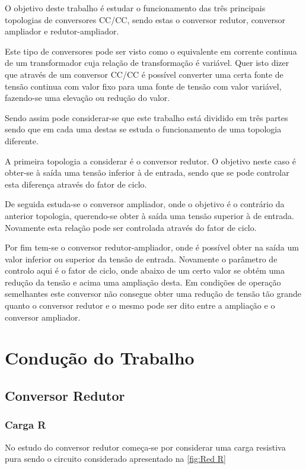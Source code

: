 \documentclass[a4paper,11pt]{article}
\numberwithin{equation}{section}
\begin{document}
O objetivo deste trabalho é estudar o funcionamento das três principais topologias de conversores CC/CC, sendo estas o conversor redutor, conversor ampliador e redutor-ampliador.

Este tipo de conversores pode ser visto como o equivalente em corrente continua de um transformador cuja relação de transformação é variável. Quer isto dizer que através de um conversor CC/CC é possível converter uma certa fonte de tensão continua com valor fixo para uma fonte de tensão com valor variável, fazendo-se uma elevação ou redução do valor. \cite{Rashid}

Sendo assim pode considerar-se que este trabalho está dividido em três partes sendo que em cada uma destas se estuda o funcionamento de uma topologia diferente.

A primeira topologia a considerar é o conversor redutor. O objetivo neste caso é obter-se à saída uma tensão inferior à de entrada, sendo que se pode controlar esta diferença através do fator de ciclo.

De seguida estuda-se o conversor ampliador, onde o objetivo é o contrário da anterior topologia, querendo-se obter à saída uma tensão superior à de entrada. Novamente esta relação pode ser controlada através do fator de ciclo.

Por fim tem-se o conversor redutor-ampliador, onde é possível obter na saída um valor inferior ou superior da tensão de entrada. Novamente o parâmetro de controlo aqui é o fator de ciclo, onde abaixo de um certo valor se obtém uma redução da tensão e acima uma ampliação desta. Em condições de operação semelhantes este conversor não consegue obter uma redução de tensão tão grande quanto o conversor redutor e o mesmo pode ser dito entre a ampliação e o conversor ampliador.


\section{Condução do Trabalho}

\subsection{Conversor Redutor}

\subsubsection{Carga R}

No estudo do conversor redutor começa-se por considerar uma carga resistiva pura sendo o circuito considerado apresentado na \autoref{fig:Red R}
\end{document}

